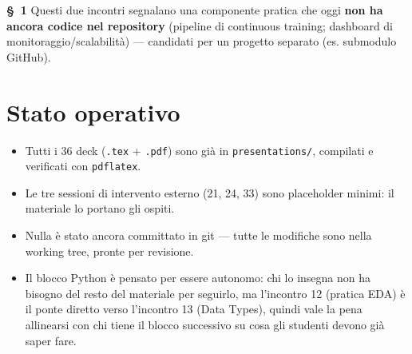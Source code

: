 \documentclass[11pt,a4paper]{article}
\newcommand{\flag}[1]{{\small\color{coursegold}\bfseries \S\ #1}}
\begin{document}
\flag{1} Questi due incontri segnalano una componente pratica che oggi \textbf{non ha ancora codice nel repository} (pipeline di continuous training; dashboard di monitoraggio/scalabilità) --- candidati per un progetto separato (es. submodulo GitHub).

\section{Stato operativo}
\begin{itemize}[leftmargin=1.4em]
\item Tutti i 36 deck (\texttt{.tex} + \texttt{.pdf}) sono già in \texttt{presentations/}, compilati e verificati con \texttt{pdflatex}.
\item Le tre sessioni di intervento esterno (21, 24, 33) sono placeholder minimi: il materiale lo portano gli ospiti.
\item Nulla è stato ancora committato in git --- tutte le modifiche sono nella working tree, pronte per revisione.
\item Il blocco Python è pensato per essere autonomo: chi lo insegna non ha bisogno del resto del materiale per seguirlo, ma l'incontro 12 (pratica EDA) è il ponte diretto verso l'incontro 13 (Data Types), quindi vale la pena allinearsi con chi tiene il blocco successivo su cosa gli studenti devono già saper fare.
\end{itemize}
\end{document}
